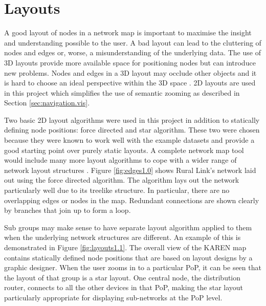 \documentclass[11pt, a4paper]{report}
\begin{document}
\section{Layouts}
\label{sec:layouts.vis}

% 

% 

A good layout of nodes in a network map is important to maximise the insight and
understanding possible to the user. A bad layout can lead to the cluttering of
nodes and edges or, worse, a misunderstanding of the underlying data. The use of
3D layouts provide more available space for positioning nodes but can introduce
new problems. Nodes and edges in a 3D layout may occlude other objects and it is
hard to choose an ideal perspective within the 3D space \cite{Lai_1998}. 2D
layouts are used in this project which simplifies the use of semantic zooming as
described in Section \ref{sec:navigation.vis}. 

Two basic 2D layout algorithms were used in this project in addition to
statically defining node positions: force directed and star algorithm. These
two were chosen because they were known to work well with the example datasets
and provide a good starting point over purely static layouts. A complete network
map tool would include many more layout algorithms to cope with a wider range of
network layout structures \cite{Paul_2000}. Figure \ref{fig:edges1.0} shows
Rural Link's network laid out using the force directed algorithm. The algorithm
lays out the network particularly well due to its treelike structure. In
particular, there are no overlapping edges or nodes in the map. Redundant
connections are shown clearly by branches that join up to form a loop. 

Sub groups may make sense to have separate layout algorithm applied to them when
the underlying network structures are different. An example of this is
demonstrated in Figure \ref{fig:layouts1.1}. The overall view of the KAREN map
contains statically defined node positions that are based on layout designs by a
graphic designer. When the user zooms in to a particular PoP, it can be seen
that the layout of that group is a star layout. One central node, the
distribution router, connects to all the other devices in that PoP, making the
star layout particularly appropriate for displaying sub-networks at the PoP
level.
\end{document}
